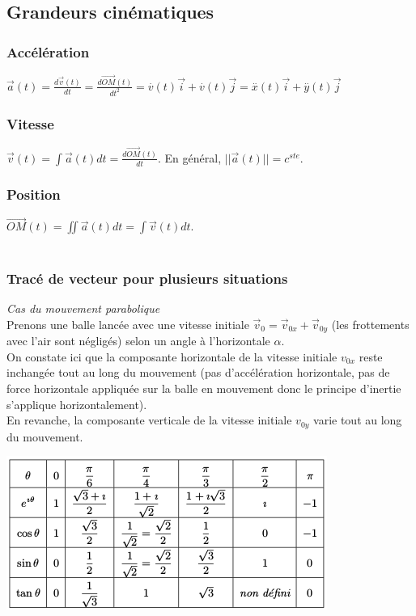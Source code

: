 \documentclass[a4paper,10pt]{book}
\begin{document}
\subsection{Grandeurs cinématiques}
\subsubsection{Accélération} 
$\vec{a}(t)=\frac{d\vec{v}(t)}{dt}=\frac{d\overset{\longrightarrow}{OM}(t)}{dt^{2}}=\overset{.}{v}(t)\vec{i}+\overset{.}{v}(t)\vec{j}=\overset{..}{x}(t)\vec{i}+\overset{..}{y}(t)\vec{j}$\\

\subsubsection{Vitesse} 
$\vec{v}(t)=\displaystyle \int \vec{a}(t)dt=\frac{d\overset{\longrightarrow}{OM}(t)}{dt}$. En général, $||\vec{a}(t)||=c^{ste}$.\\

\subsubsection{Position} 
$\overset{\longrightarrow}{OM}(t)=\displaystyle \iint \vec{a}(t)dt=\displaystyle \int \vec{v}(t)dt$.\\\\

\subsubsection{Tracé de vecteur pour plusieurs situations}
\emph{Cas du mouvement parabolique}\\
Prenons une balle lancée avec une vitesse initiale $\vec{v}_{0}=\vec{v}_{0x}+\vec{v}_{0y}$ (les frottements avec l’air sont négligés) selon un angle à l'horizontale $\alpha$.\\
On constate ici que la composante horizontale de la vitesse initiale $v_{0x}$ reste inchangée tout au long du mouvement (pas d’accélération horizontale, pas de force horizontale appliquée sur la balle en mouvement donc le principe d’inertie s’applique horizontalement).\\
En revanche, la composante verticale de la vitesse initiale $v_{0y}$ varie tout au long du mouvement.
\begin{center}
\includegraphics[scale=0.45]{images/007.png}
\end{center}
\end{document}
